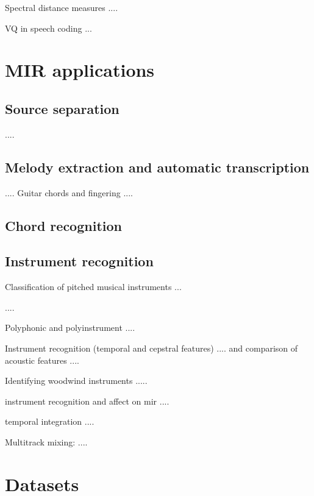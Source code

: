 \documentclass[journal]{IEEEtran}
\begin{document}
Spectral distance measures \cite{viswanathan1976spectralDistance}....

VQ in speech coding \cite{gersho1992vq}...

\section{MIR applications}
\subsection{Source separation}
\cite{slaney1994soundSeparation}....
\subsection{Melody extraction and automatic transcription}

\cite{benetos2013automatic,ohanlon2013automatic,peeters2006music}....
Guitar chords and fingering \cite{barbancho2012automatic}....
\subsection{Chord recognition}
\subsection{Instrument recognition}
Classification of pitched musical instruments \cite{herrera2006automatic}...

\cite{martin1998musical,yu2014sparse}....

Polyphonic and polyinstrument \cite{hamel2009automatic}....

Instrument recognition (temporal and cepstral features) \cite{eronen2000musical}.... and comparison of acoustic features \cite{eronen2001comparison}....

Identifying woodwind instruments \cite{brown2001feature}.....

instrument recognition and affect on mir \cite{kitahara2007computational}....

temporal integration \cite{Joder:09}....

Multitrack mixing: \cite{scottinstrument,scott2011automatic}....

\section{Datasets}

\ifCLASSOPTIONcaptionsoff
  \newpage
\fi







\end{document}
